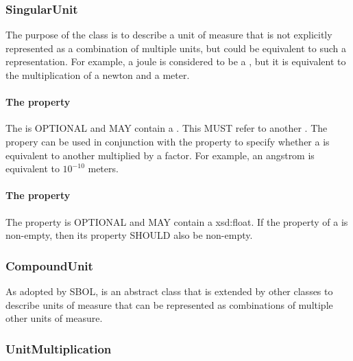 \subsubsection{SingularUnit}
\label{sec:SingularUnit}

The purpose of the  class is to describe a unit of measure that is not explicitly represented as a combination of multiple units, but could be equivalent to such a representation. For example, a joule is considered to be a , but it is equivalent to the multiplication of a newton and a meter.  

\paragraph{The  property}\label{sec:hasUnit:SingularUnit}
The  is OPTIONAL and MAY contain a . This  MUST refer to another . The  propery can be used in conjunction with the  property to specify whether a  is equivalent to another  multiplied by a factor. For example, an angstrom is equivalent to $10^{-10}$ meters.

\paragraph{The  property}\label{sec:hasFactor:SingularUnit}
The  property is OPTIONAL and MAY contain a xsd:float. If the  property of a  is non-empty, then its  property SHOULD also be non-empty.

\subsubsection{CompoundUnit}
\label{sec:CompoundUnit}

As adopted by SBOL,  is an abstract class that is extended by other classes to describe units of measure that can be represented as combinations of multiple other units of measure.

\subsubsection{UnitMultiplication}
\label{sec:UnitMultiplication}

